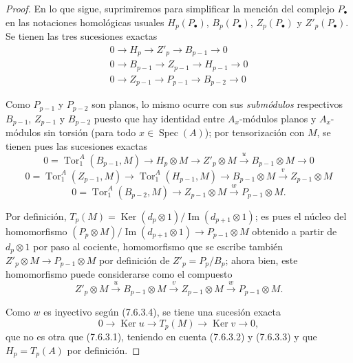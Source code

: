\begin{proof}
En lo que sigue, suprimiremos para simplificar la mención del complejo
$P_\bullet$ en las notaciones homológicas usuales $H_p(P_\bullet)$,
$B_p(P_\bullet)$, $Z_p(P_\bullet)$ y $Z'_p(P_\bullet)$. Se tienen las tres sucesiones
exactas
\begin{gather*}
  0\longrightarrow H_p\longrightarrow Z'_p\longrightarrow B_{p-1}
  \longrightarrow0\\
  0\longrightarrow B_{p-1}\longrightarrow Z_{p-1}\longrightarrow H_{p-1}
  \longrightarrow0\\
  0\longrightarrow Z_{p-1}\longrightarrow P_{p-1}\longrightarrow B_{p-2}
  \longrightarrow0
\end{gather*}

Como $P_{p-1}$ y $P_{p-2}$ son planos, lo mismo ocurre con sus
\emph{submódulos} respectivos $B_{p-1}$, $Z_{p-1}$ y $B_{p-2}$ puesto que hay
identidad entre $A_x$-módulos planos y $A_x$-módulos sin torsión (para todo
$x\in\operatorname{Spec}(A)$); por tensorización con $M$, se tienen pues las sucesiones
exactas
\[
  0=\operatorname{Tor}_1^A(B_{p-1},M)
  \longrightarrow H_p\otimes M
  \longrightarrow Z'_p\otimes M
  \xrightarrow{u}B_{p-1}\otimes M
  \longrightarrow0
  \tag{7.6.3.2}\label{III.7.6.3.2.fr}
\]
\[
  0=\operatorname{Tor}_1^A(Z_{p-1},M)
  \longrightarrow\operatorname{Tor}_1^A(H_{p-1},M)
  \longrightarrow B_{p-1}\otimes M
  \xrightarrow{v}Z_{p-1}\otimes M
  \tag{7.6.3.3}\label{III.7.6.3.3.fr}
\]
\[
  0=\operatorname{Tor}_1^A(B_{p-2},M)
  \longrightarrow Z_{p-1}\otimes M
  \xrightarrow{w}P_{p-1}\otimes M.
  \tag{7.6.3.4}\label{III.7.6.3.4.fr}
\]

Por definición,
$T_p(M)=\operatorname{Ker}(d_p\otimes1)/\operatorname{Im}(d_{p+1}\otimes1)$;
es pues el núcleo del homomorfismo
$(P_p\otimes M)/\operatorname{Im}(d_{p+1}\otimes1)\longrightarrow P_{p-1}\otimes M$
obtenido a partir de $d_p\otimes1$ por paso al cociente, homomorfismo que
se escribe también $Z'_p\otimes M\to P_{p-1}\otimes M$ por definición de
$Z'_p=P_p/B_p$; ahora bien, este homomorfismo puede considerarse como el compuesto
\[
  Z'_p\otimes M
  \xrightarrow{u}B_{p-1}\otimes M
  \xrightarrow{v}Z_{p-1}\otimes M
  \xrightarrow{w}P_{p-1}\otimes M.
\]

Como $w$ es inyectivo según (7.6.3.4), se tiene una sucesión exacta
\[
  0\longrightarrow\operatorname{Ker}u
  \longrightarrow T_p(M)
  \longrightarrow\operatorname{Ker}v
  \longrightarrow0,
\]
que no es otra que (7.6.3.1), teniendo en cuenta (7.6.3.2) y (7.6.3.3) y
que $H_p=T_p(A)$ por definición.
\end{proof}

